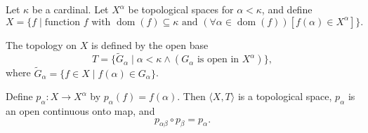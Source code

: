 Let $\kappa$ be a cardinal. Let $X^{\alpha}$ be topological spaces for $\alpha < \kappa$, and define
$$X = \{f \mid \text{function } f \text{ with } \operatorname{dom}(f) \subseteq \kappa \text{ and } (\forall \alpha \in \operatorname{dom}(f))[f(\alpha) \in X^{\alpha}]\}.$$

The topology on $X$ is defined by the open base
$$T = \{\tilde{G}_{\alpha} \mid \alpha < \kappa \land (G_{\alpha} \text{ is open in } X^{\alpha})\},$$
where $\tilde{G}_{\alpha} = \{f \in X \mid f(\alpha) \in G_{\alpha}\}$.

Define $p_{\alpha}: X \to X^{\alpha}$ by $p_{\alpha}(f) = f(\alpha)$. Then $\langle X, T \rangle$ is a topological space, $p_{\alpha}$ is an open continuous onto map, and
$$p_{\alpha\beta} \circ p_{\beta} = p_{\alpha}.$$
